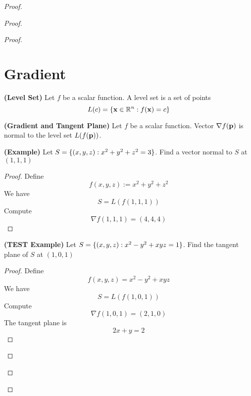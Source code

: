 \documentclass{report}
\begin{document}
\begin{proof}
\begin{proof}
\begin{proof}
\section{Gradient}
\begin{definition}
\label{6.5.1}
\textbf{(Level Set)} Let $f$ be a scalar function. A level set is a set of points
\begin{equation}
L(c)=\{ \textbf{x}\in\mathbb{R}^n: f(\textbf{x})=c \}
\end{equation}
\end{definition}
\begin{theorem}
\label{6.5.2}
\textbf{(Gradient and Tangent Plane)} Let $f$ be a scalar function. Vector $\nabla f(\textbf{p})$ is normal to the level set $L(f(\textbf{p}))$. 
\end{theorem}
\begin{theorem}
\label{6.5.3}
\textbf{(Example)} Let $S=\{ (x,y,z):x^2+y^2+z^2=3 \}$. Find a vector normal to $S$ at  $(1,1,1)$
\end{theorem}
\begin{proof}
Define
\begin{equation}
f(x,y,z):=x^2+y^2+z^2 
\end{equation}
We have
\begin{equation}
S=L(f(1,1,1))
\end{equation}
Compute
\begin{equation}
\nabla f(1,1,1)=(4,4,4)
\end{equation}
\end{proof}
\begin{theorem}
\label{6.5.4}
\textbf{(TEST Example)} Let $S=\{ (x,y,z):x^2-y^2+xyz=1 \}$. Find the tangent plane of $S$ at $(1,0,1)$ 
\end{theorem}
\begin{proof}
Define
\begin{equation}
f(x,y,z)=x^2-y^2+xyz
\end{equation}
We have
\begin{equation}
S=L(f(1,0,1))
\end{equation}
Compute
\begin{equation}
\nabla f(1,0,1)=(2,1,0)
\end{equation}
The tangent plane is 
\begin{equation}
2x+y=2
\end{equation}
\end{proof}

\end{proof}
\end{proof}
\end{proof}
\end{document}
